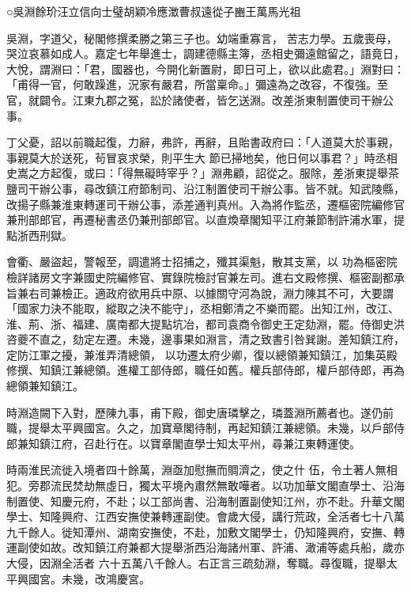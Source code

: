 
\begin{pinyinscope}

 ○吳淵餘玠汪立信向士璧胡穎冷應澂曹叔遠從子豳王萬馬光祖



 吳淵，字道父，秘閣修撰柔勝之第三子也。幼端重寡言，
 苦志力學。五歲喪母，哭泣哀慕如成人。嘉定七年舉進士，調建德縣主簿，丞相史彌遠館留之，語竟日，大悅，謂淵曰：「君，國器也，今開化新置尉，即日可上，欲以此處君。」淵對曰：「甫得一官，何敢躁進，況家有嚴君，所當稟命。」彌遠為之改容，不復強。至官，就闢令。江東九郡之冤，訟於諸使者，皆乞送淵。改差浙東制置使司干辦公事。



 丁父憂，詔以前職起復，力辭，弗許，再辭，且貽書政府曰：「人道莫大於事親，事親莫大於送死，茍冒哀求榮，則平生大
 節已掃地矣，他日何以事君？」時丞相史嵩之方起復，或曰：「得無礙時宰乎？」淵弗顧，詔從之。服除，差浙東提舉茶鹽司干辦公事，尋改鎮江府節制司、沿江制置使司干辦公事。皆不就。知武陵縣，改揚子縣兼淮東轉運司干辦公事，添差通判真州。入為將作監丞，遷樞密院編修官兼刑部郎官，再遷秘書丞仍兼刑部郎官。以直煥章閣知平江府兼節制許浦水軍，提點浙西刑獄。



 會衢、嚴盜起，警報至，調遣將士招捕之，殲其渠魁，散其支黨，以
 功為樞密院檢詳諸房文字兼國史院編修官、實錄院檢討官兼左司。進右文殿修撰、樞密副都承旨兼右司兼檢正。適政府欲用兵中原、以據關守河為說，淵力陳其不可，大要謂「國家力決不能取，縱取之決不能守」，丞相鄭清之不樂而罷。出知江州，改江、淮、荊、浙、福建、廣南都大提點坑冶，都司袁商令御史王定劾淵，罷。侍御史洪咨夔不直之，劾定左遷。未幾，邊事果如淵言，清之致書引咎巽謝。差知鎮江府，定防江軍之擾，兼淮弄清總領，
 以功遷太府少卿，復以總領兼知鎮江，加集英殿修撰、知鎮江兼總領。進權工部侍郎，職任如舊。權兵部侍郎，權戶部侍郎，再為總領兼知鎮江。



 時淵造闕下入對，歷陳九事，甫下殿，御史唐璘擊之，璘蓋淵所薦者也。遂仍前職，提舉太平興國宮。久之，加寶章閣待制，再起知鎮江兼總領。未幾，以戶部侍郎兼知鎮江府，召赴行在。以寶章閣直學士知太平州，尋兼江東轉運使。



 時兩淮民流徙入境者四十餘萬，淵亟加慰撫而賙濟之，使之什
 伍，令土著人無相犯。旁郡流民焚劫無虛日，獨太平境內肅然無敢嘩者。以功加華文閣直學士、沿海制置使、知慶元府，不赴；以工部尚書、沿海制置副使知江州，亦不赴。升華文閣學士、知隆興府、江西安撫使兼轉運副使。會歲大侵，講行荒政，全活者七十八萬九千餘人。徙知潭州、湖南安撫使，不赴，加敷文閣學士，仍知隆興府，安撫、轉運副使如故。改知鎮江府兼都大提舉浙西沿海諸州軍、許浦、澉浦等處兵船，歲亦大侵，因淵全活者
 六十五萬八千餘人。右正言三疏劾淵，奪職。尋復職，提舉太平興國宮。未幾，改鴻慶宮。




\end{pinyinscope}
